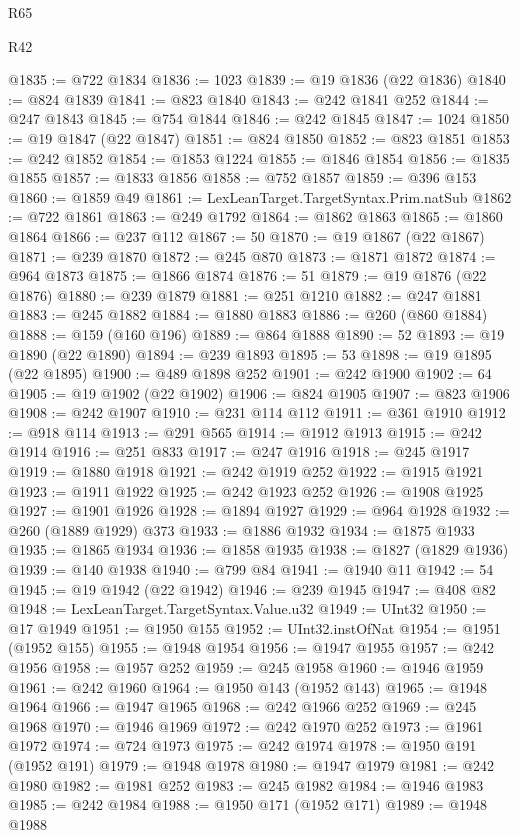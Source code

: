 \begin{lexlean}{R65}
\begin{lexlean}{R42}
\begin{coremodule}
{{{{{{{{{{{{{{{{{{{{{{{{{{{{{{{{{{{{{{{{{{{{{{{{{{{{{{{{{{{{{{{{{{{{{{{{{{{{{{{{{{{{{{{{{{{{{{{{{{{{{{{{{{{{{{{{{{{{{{{{{{{{{{{{{{{{{{{{{{{{{{{{{{{{{{{{{{{{{{{{{{{{{{{{{{{{{{{{{{{{{{{{@1835 := @722 @1834
@1836 := 1023
@1839 := @19 @1836 (@22 @1836)
@1840 := @824 @1839
@1841 := @823 @1840
@1843 := @242 @1841 @252
@1844 := @247 @1843
@1845 := @754 @1844
@1846 := @242 @1845
@1847 := 1024
@1850 := @19 @1847 (@22 @1847)
@1851 := @824 @1850
@1852 := @823 @1851
@1853 := @242 @1852
@1854 := @1853 @1224
@1855 := @1846 @1854
@1856 := @1835 @1855
@1857 := @1833 @1856
@1858 := @752 @1857
@1859 := @396 @153
@1860 := @1859 @49
@1861 := LexLeanTarget.TargetSyntax.Prim.natSub
@1862 := @722 @1861
@1863 := @249 @1792
@1864 := @1862 @1863
@1865 := @1860 @1864
@1866 := @237 @112
@1867 := 50
@1870 := @19 @1867 (@22 @1867)
@1871 := @239 @1870
@1872 := @245 @870
@1873 := @1871 @1872
@1874 := @964 @1873
@1875 := @1866 @1874
@1876 := 51
@1879 := @19 @1876 (@22 @1876)
@1880 := @239 @1879
@1881 := @251 @1210
@1882 := @247 @1881
@1883 := @245 @1882
@1884 := @1880 @1883
@1886 := @260 (@860 @1884)
@1888 := @159 (@160 @196)
@1889 := @864 @1888
@1890 := 52
@1893 := @19 @1890 (@22 @1890)
@1894 := @239 @1893
@1895 := 53
@1898 := @19 @1895 (@22 @1895)
@1900 := @489 @1898 @252
@1901 := @242 @1900
@1902 := 64
@1905 := @19 @1902 (@22 @1902)
@1906 := @824 @1905
@1907 := @823 @1906
@1908 := @242 @1907
@1910 := @231 @114 @112
@1911 := @361 @1910
@1912 := @918 @114
@1913 := @291 @565
@1914 := @1912 @1913
@1915 := @242 @1914
@1916 := @251 @833
@1917 := @247 @1916
@1918 := @245 @1917
@1919 := @1880 @1918
@1921 := @242 @1919 @252
@1922 := @1915 @1921
@1923 := @1911 @1922
@1925 := @242 @1923 @252
@1926 := @1908 @1925
@1927 := @1901 @1926
@1928 := @1894 @1927
@1929 := @964 @1928
@1932 := @260 (@1889 @1929) @373
@1933 := @1886 @1932
@1934 := @1875 @1933
@1935 := @1865 @1934
@1936 := @1858 @1935
@1938 := @1827 (@1829 @1936)
@1939 := @140 @1938
@1940 := @799 @84
@1941 := @1940 @11
@1942 := 54
@1945 := @19 @1942 (@22 @1942)
@1946 := @239 @1945
@1947 := @408 @82
@1948 := LexLeanTarget.TargetSyntax.Value.u32
@1949 := UInt32
@1950 := @17 @1949
@1951 := @1950 @155
@1952 := UInt32.instOfNat
@1954 := @1951 (@1952 @155)
@1955 := @1948 @1954
@1956 := @1947 @1955
@1957 := @242 @1956
@1958 := @1957 @252
@1959 := @245 @1958
@1960 := @1946 @1959
@1961 := @242 @1960
@1964 := @1950 @143 (@1952 @143)
@1965 := @1948 @1964
@1966 := @1947 @1965
@1968 := @242 @1966 @252
@1969 := @245 @1968
@1970 := @1946 @1969
@1972 := @242 @1970 @252
@1973 := @1961 @1972
@1974 := @724 @1973
@1975 := @242 @1974
@1978 := @1950 @191 (@1952 @191)
@1979 := @1948 @1978
@1980 := @1947 @1979
@1981 := @242 @1980
@1982 := @1981 @252
@1983 := @245 @1982
@1984 := @1946 @1983
@1985 := @242 @1984
@1988 := @1950 @171 (@1952 @171)
@1989 := @1948 @1988
}}}}}}}}}}}}}}}}}}}}}}}}}}}}}}}}}}}}}}}}}}}}}}}}}}}}}}}}}}}}}}}}}}}}}}}}}}}}}}}}}}}}}}}}}}}}}}}}}}}}}}}}}}}}}}}}}}}}}}}}}}}}}}}}}}}}}}}}}}}}}}}}}}}}}}}}}}}}}}}}}}}}}}}}}}}}}}}}}}}}}}}}
\end{coremodule}
\end{lexlean}
\end{lexlean}

